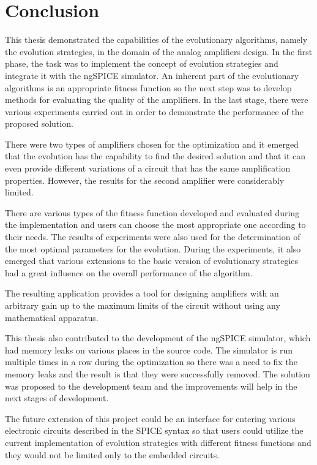\chapter{Conclusion}
This thesis demonstrated the capabilities of the evolutionary algorithms, namely the evolution strategies, in the domain of the analog amplifiers design. In the first phase, the task was to implement the concept of evolution strategies and integrate it with the ngSPICE simulator. An inherent part of the evolutionary algorithms is an appropriate fitness function so the next step was to develop methods for evaluating the quality of the amplifiers. In the last stage, there were various experiments carried out in order to demonstrate the performance of the proposed solution.

There were two types of amplifiers chosen for the optimization and it emerged that the evolution has the capability to find the desired solution and that it can even provide different variations of a circuit that has the same amplification properties. However, the results for the second amplifier were considerably limited.

There are various types of the fitness function developed and evaluated during the implementation and users can choose the most appropriate one according to their needs. The results of experiments were also used for the determination of the most optimal parameters for the evolution. During the experiments, it also emerged that various extensions to the basic version of evolutionary strategies had a great influence on the overall performance of the algorithm.

The resulting application provides a tool for designing amplifiers with an arbitrary gain up to the maximum limits of the circuit without using any mathematical apparatus.

This thesis also contributed to the development of the ngSPICE simulator, which had memory leaks on various places in the source code. The simulator is run multiple times in a row during the optimization so there was a need to fix the memory leaks and the result is that they were successfully removed. The solution was proposed to the development team and the improvements will help in the next stages of development.

The future extension of this project could be an interface for entering various electronic circuits described in the SPICE syntax so that users could utilize the current implementation of evolution strategies with different fitness functions and they would not be limited only to the embedded circuits.